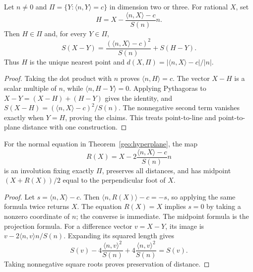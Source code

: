 \begin{theorem}
\label{geo:hyperplane}
Let $n\ne0$ and $\Pi=\{Y:\langle n,Y\rangle=c\}$ in dimension two or three.
For rational $X$, set
\[
 H=X-\frac{\langle n,X\rangle-c}{S(n)}n.
\]
Then $H\in\Pi$ and, for every $Y\in\Pi$,
\[
 S(X-Y)=\frac{(\langle n,X\rangle-c)^2}{S(n)}+S(H-Y).
\]
Thus $H$ is the unique nearest point and
$d(X,\Pi)=|\langle n,X\rangle-c|/|n|$.
\end{theorem}
\begin{proof}
Taking the dot product with $n$ proves $\langle n,H\rangle=c$.
The vector $X-H$ is a scalar multiple of $n$, while
$\langle n,H-Y\rangle=0$. Applying Pythagoras to
$X-Y=(X-H)+(H-Y)$ gives the identity, and
$S(X-H)=(\langle n,X\rangle-c)^2/S(n)$.
The nonnegative second term vanishes exactly when $Y=H$, proving the claims.
This treats point-to-line and point-to-plane distance with one construction.
\end{proof}

\begin{theorem}
\label{geo:reflection}
For the normal equation in Theorem~\ref{geo:hyperplane}, the map
\[
 R(X)=X-2\frac{\langle n,X\rangle-c}{S(n)}n
\]
is an involution fixing exactly $\Pi$, preserves all distances, and has
midpoint $(X+R(X))/2$ equal to the perpendicular foot of $X$.
\end{theorem}
\begin{proof}
Let $s=\langle n,X\rangle-c$. Then
$\langle n,R(X)\rangle-c=-s$, so applying the same formula twice returns
$X$. The equation $R(X)=X$ implies $s=0$ by taking a nonzero coordinate of
$n$; the converse is immediate. The midpoint formula is the projection
formula. For a difference vector $v=X-Y$, its image is
$v-2\langle n,v\rangle n/S(n)$. Expanding its squared length gives
\[
 S(v)-4\frac{\langle n,v\rangle^2}{S(n)}
       +4\frac{\langle n,v\rangle^2}{S(n)}=S(v).
\]
Taking nonnegative square roots proves preservation of distance.
\end{proof}

